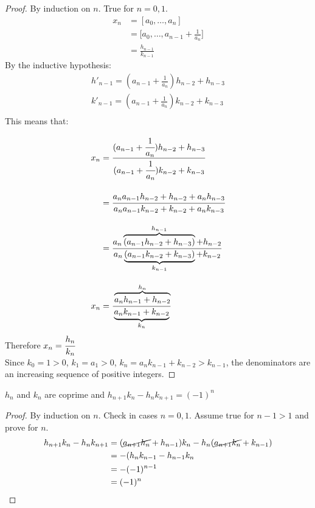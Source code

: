 \documentclass[11pt]{article}
\begin{document}
\begin{proof}
By induction on $n$. True for $n=0,1$.
	\begin{align*}
		x_n &= [a_0,\dots,a_n]\\[0.5em]
		&= \Bigg[a_0,\dots,a_{n-1}+\frac{1}{a_n} \Bigg ]\\[1em]
		& = \frac{h_{n-1}}{k_{n-1}}
	\end{align*}
	\vspace{-0.5em}
	By the inductive hypothesis:
	\begin{align*}
		h'_{n-1} = (a_{n-1} + \frac{1}{a_n})h_{n-2} + h_{n-3}\\
		k'_{n-1} = (a_{n-1} + \frac{1}{a_n})k_{n-2} + k_{n-3}\\
	\end{align*}
This means that:

	\begin{align*}
		x_n &= \cfrac{(a_{n-1}+\cfrac{1}{a_n})h_{n-2} + h_{n-3} }{(a_{n-1}+\cfrac{1}{a_n})k_{n-2}+k_{n-3}}\\[1em]
		&= \cfrac{a_n a_{n-1}h_{n-2} +h_{n-2} +a_nh_{n-3} }{a_n a_{n-1}k_{n-2} +k_{n-2} +a_nk_{n-3}} \\[1em]
		&= \cfrac{a_n \overbrace{(a_{n-1}h_{n-2} + h_{n-3}) }^{h_{n-1}} +h_{n-2}}{a_n \underbrace{(a_{n-1}k_{n-2} + k_{n-3}) }_{k_{n-1}} +k_{n-2}}\\[1em]
		x_n &= \cfrac{\overbrace{a_nh_{n-1}+h_{n-2}}^{h_n} }{\underbrace{a_nk_{n-1} + k_{n-2}}_{k_n}}
	\end{align*}
	Therefore $x_n = \cfrac{h_n}{k_n}$\\
$ $\\
	Since $k_0 = 1 >0 $, \hspace{7pt}$k_1 = a_1 > 0$, \hspace{7pt} $k_n= a_nk_{n-1} +k_{n-2} >k_{n-1}$, the denominators are an increasing sequence of positive integers. 

\end{proof}


\begin{lemma}
	$h_n$ and $k_n$ are coprime and $h_{n+1}k_n - h_nk_{n+1} = (-1)^n$
\end{lemma}

\begin{proof}
By induction on $n$. Check in cases $n=0,1$. Assume true for $n-1 > 1$ and prove for $n$.
	\begin{align*}
		h_{n+1}k_n-h_nk_{n+1} &= (\cancel{a_{n+1}h_n} + h_{n-1})k_n - h_n(\cancel{a_{n+1}k_n} + k_{n-1})\\
		&= -(h_nk_{n-1} -h_{n-1}k_n\\
		&= -(-1)^{n-1}\\
		&= (-1)^n
	\end{align*}
\end{proof}
\end{document}
